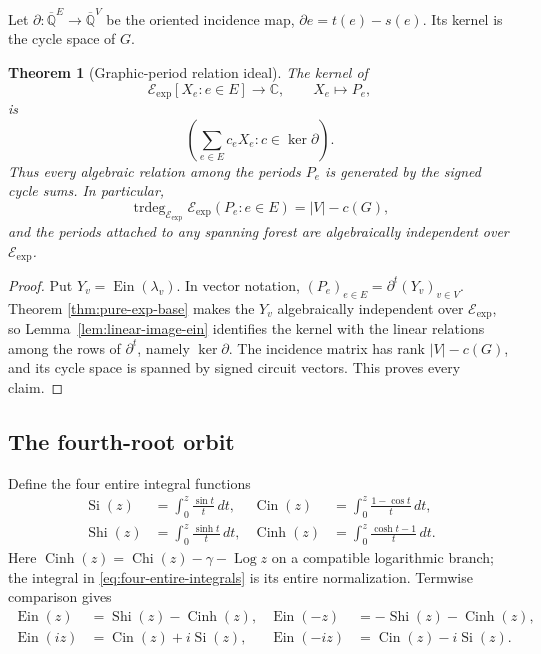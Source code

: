 \documentclass[11pt]{article}
\newtheorem{theorem}{Theorem}[section]
\theoremstyle{definition}
\theoremstyle{remark}
\newcommand{\Qbar}{\overline{\mathbb Q}}
\newcommand{\C}{\mathbb C}
\newcommand{\Ein}{\operatorname{Ein}}
\newcommand{\Cin}{\operatorname{Cin}}
\newcommand{\Chi}{\operatorname{Chi}}
\newcommand{\Eexp}{\mathcal E_{\mathrm{exp}}}
\newcommand{\Si}{\operatorname{Si}}
\newcommand{\Shi}{\operatorname{Shi}}
\newcommand{\Cinh}{\operatorname{Cinh}}
\newcommand{\Log}{\operatorname{Log}}
\begin{document}
Let \(\partial:\Qbar^E\to\Qbar^V\) be the oriented incidence map,
\(\partial e=t(e)-s(e)\).  Its kernel is the cycle space of \(G\).

\begin{theorem}[Graphic-period relation ideal]\label{thm:graphic-period}
The kernel of
\[
 \Eexp[X_e:e\in E]\longrightarrow\C,
 \qquad X_e\longmapsto P_e,
\]
is
\begin{equation}\label{eq:cycle-ideal}
 \left(\sum_{e\in E}c_eX_e:c\in\ker\partial\right).
\end{equation}
Thus every algebraic relation among the periods \(P_e\) is generated by the
signed cycle sums.  In particular,
\[
 \operatorname{trdeg}_{\Eexp}\Eexp(P_e:e\in E)
   =|V|-c(G),
\]
and the periods attached to any spanning forest are algebraically
independent over \(\Eexp\).
\end{theorem}

\begin{proof}
Put \(Y_v=\Ein(\lambda_v)\).  In vector notation,
\((P_e)_{e\in E}=\partial^t(Y_v)_{v\in V}\).  Theorem
\ref{thm:pure-exp-base} makes the \(Y_v\) algebraically independent over
\(\Eexp\), so Lemma~\ref{lem:linear-image-ein} identifies the kernel with
the linear relations among the rows of \(\partial^t\), namely
\(\ker\partial\).  The incidence matrix has rank \(|V|-c(G)\), and its
cycle space is spanned by signed circuit vectors.  This proves every claim.
\end{proof}

\subsection{The fourth-root orbit}

Define the four entire integral functions
\begin{equation}\label{eq:four-entire-integrals}
\begin{aligned}
 \Si(z)&=\int_0^z\frac{\sin t}{t}\,dt,&
 \Cin(z)&=\int_0^z\frac{1-\cos t}{t}\,dt,\\
 \Shi(z)&=\int_0^z\frac{\sinh t}{t}\,dt,&
 \Cinh(z)&=\int_0^z\frac{\cosh t-1}{t}\,dt.
\end{aligned}
\end{equation}
Here \(\Cinh(z)=\Chi(z)-\gamma-\Log z\) on a compatible logarithmic
branch; the integral in \eqref{eq:four-entire-integrals} is its entire
normalization.  Termwise comparison gives
\begin{equation}\label{eq:fourth-root-transform}
\begin{aligned}
 \Ein(z)&=\Shi(z)-\Cinh(z),&
 \Ein(-z)&=-\Shi(z)-\Cinh(z),\\
 \Ein(iz)&=\Cin(z)+i\Si(z),&
 \Ein(-iz)&=\Cin(z)-i\Si(z).
\end{aligned}
\end{equation}
\end{document}
